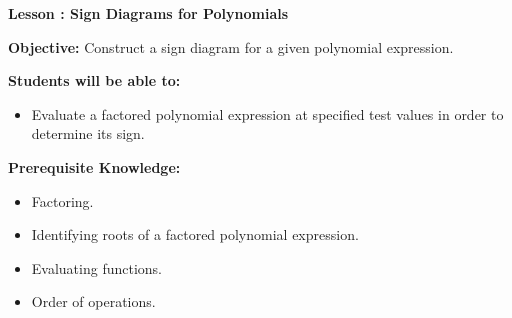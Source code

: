 \documentclass[12pt]{article}
\theoremstyle{definition}
\begin{document}
{\bf \large Lesson : Sign Diagrams for Polynomials}\label{les:sign_diagrams_polynomials}
\hfill \doclicenseImage[imagewidth=5em]\\
\par
{\bf Objective:} Construct a sign diagram for a given polynomial expression.\\
\par
{\bf Students will be able to:}
\begin{itemize}
	\item Evaluate a factored polynomial expression at specified test values in order to determine its sign.
\end{itemize}
{\bf Prerequisite Knowledge:}
\begin{itemize}
	\item Factoring.
	\item Identifying roots of a factored polynomial expression.
	\item Evaluating functions.
	\item Order of operations.
\end{itemize}
\hrulefill
\end{document}
